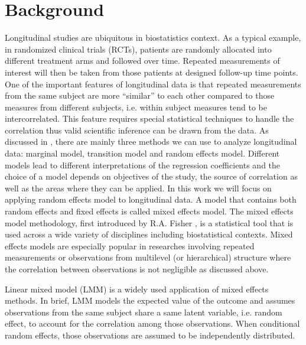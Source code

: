 \documentclass{article}
\begin{document}
\section{Background}
Longitudinal studies are ubiquitous in biostatistics context. As a typical example, in randomized clinical trials (RCTs), patients are randomly allocated into different treatment arms and followed over time. Repeated measurements of interest will then be taken from those patients at designed follow-up time points. One of the important features of longitudinal data is that repeated measurements from the same subject are more ``similar'' to each other compared to those measures from different subjects, i.e. within subject measures tend to be intercorrelated. This feature requires special statistical techniques to handle the correlation thus valid scientific inference can be drawn from the data. As discussed in \cite{diggle2002analysis}, there are mainly three methods we can use to analyze longitudinal data: marginal model, transition model and random effects model. Different models lead to different interpretations of the regression coefficients and the choice of a model depends on objectives of the study, the source of correlation as well as the areas where they can be applied. In this work we will focus on applying random effects model to longitudinal data. A model that contains both random effects and fixed effects is called mixed effects model. The mixed effects model methodology, first introduced by R.A. Fisher \cite{fisher1919xv},  is a statistical tool that is used across a wide variety of disciplines including biostatistical contexts. Mixed effects models are especially popular in researches involving repeated measurements or observations from multilevel (or hierarchical) structure where the correlation between observations is not negligible as discussed above.\par

Linear mixed model (LMM) is a widely used application of mixed effects methods. In brief, LMM models the expected value of the outcome and assumes observations from the same subject share a same latent variable, i.e. random effect, to account for the correlation among those observations. When conditional random effects, those observations are assumed to be independently distributed.
\end{document}
